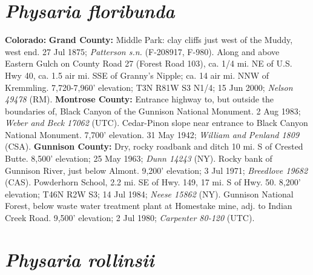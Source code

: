 \section*{\textit{Physaria floribunda}}

  \textbf{Colorado:}
  \textbf{Grand County:}
Middle Park: clay cliffs just west of the Muddy, west end. 27 Jul 1875;
\textit{Patterson s.n.} (F-208917, F-980).
Along and above Eastern Gulch on County Road 27 (Forest Road 103), ca. 1/4 mi.
NE of U.S. Hwy 40, ca. 1.5 air mi. SSE of Granny's Nipple; ca. 14 air mi. NNW
of Kremmling. 7,720-7,960' elevation; T3N R81W S3 N1/4; 15 Jun 2000;
\textit{Nelson 49478} (RM).
  \textbf{Montrose County:}
Entrance highway to, but outside the boundaries of, Black Canyon of the
Gunnison National Monument. 2 Aug 1983; \textit{Weber and Beck 17062} (UTC).
Cedar-Pinon slope near entrance to Black Canyon National Monument.
7,700' elevation. 31 May 1942; \textit{William and Penland 1809} (CSA).
  \textbf{Gunnison County:}
Dry, rocky roadbank and ditch 10 mi. S of Crested Butte. 8,500' elevation;
25 May 1963; \textit{Dunn 14243} (NY).
Rocky bank of Gunnison River, just below Almont. 9,200' elevation; 3 Jul 1971;
\textit{Breedlove 19682} (CAS).
Powderhorn School, 2.2 mi. SE of Hwy. 149, 17 mi. S of Hwy. 50.
8,200' elevation; T46N R2W S3; 14 Jul 1984; \textit{Neese 15862} (NY).
Gunnison National Forest, below waste water treatment plant at Homestake mine,
adj. to Indian Creek Road. 9,500' elevation; 2 Jul 1980;
\textit{Carpenter 80-120} (UTC).

\section*{\textit{Physaria rollinsii}}

